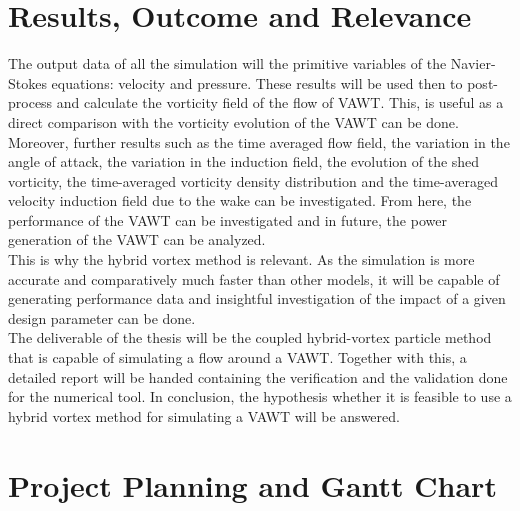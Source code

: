 \section{Results, Outcome and Relevance}
\label{sec:result}


The output data of all the simulation will the primitive variables of the Navier-Stokes equations: velocity and pressure. These results will be used then to post-process and calculate the vorticity field of the flow of VAWT. This, is useful as a direct comparison with the vorticity evolution of the VAWT can be done. Moreover, further results such as the time averaged flow field, the variation in the angle of attack, the variation in the induction field, the evolution of the shed vorticity, the time-averaged vorticity density distribution and the time-averaged velocity induction field due to the wake can be investigated. From here, the performance of the VAWT can be investigated and in future, the power generation of the VAWT can be analyzed.\\

This is why the hybrid vortex method is relevant. As the simulation is more accurate and comparatively much faster than other models, it will be capable of generating performance data and insightful investigation of the impact of a given design parameter can be done.\\

The deliverable of the thesis will be the coupled hybrid-vortex particle method that is capable of simulating a flow around a VAWT. Together with this, a detailed report will be handed containing the verification and the validation done for the numerical tool. In conclusion, the hypothesis whether it is feasible to use a hybrid vortex method for simulating a VAWT will be answered.\\


\section{Project Planning and Gantt Chart}
\label{sec:planning}

